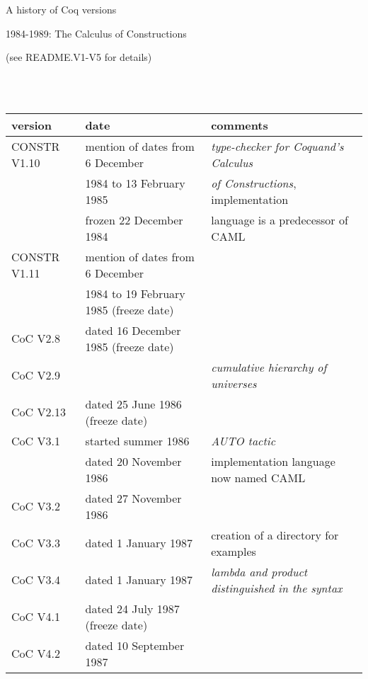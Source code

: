 \documentclass[a4paper]{book}
\newcommand{\feature}[1]{{\em #1}}
\begin{document}
\begin{center}
\begin{huge}
A history of Coq versions
\end{huge}
\end{center}
\bigskip

\centerline{\large 1984-1989: The Calculus of Constructions}

\bigskip
\centerline{\large (see README.V1-V5 for details)}
\mbox{}\\
\mbox{}\\
\begin{tabular}{l|l|l}
version & date & comments \\
\hline

CONSTR V1.10& mention of dates from 6 December & \feature{type-checker for Coquand's Calculus }\\
         & 1984 to 13 February 1985 & \feature{of Constructions}, implementation  \\
         & frozen 22 December 1984 & language is a predecessor of CAML\\

CONSTR V1.11& mention of dates from 6 December\\
         & 1984 to 19 February 1985 (freeze date) &\\

CoC V2.8& dated 16 December 1985 (freeze date)\\

CoC V2.9& & \feature{cumulative hierarchy of universes}\\

CoC V2.13& dated 25 June 1986 (freeze date)\\

CoC V3.1& started summer 1986 & \feature{AUTO tactic}\\
  & dated 20 November 1986 & implementation language now named CAML\\

CoC V3.2& dated 27 November 1986\\

CoC V3.3& dated 1 January 1987 & creation of a directory for examples\\

CoC V3.4& dated 1 January 1987 & \feature{lambda and product distinguished in the syntax}\\

CoC V4.1& dated 24 July 1987 (freeze date)\\

CoC V4.2& dated 10 September 1987\\


\end{tabular}
\end{document}

